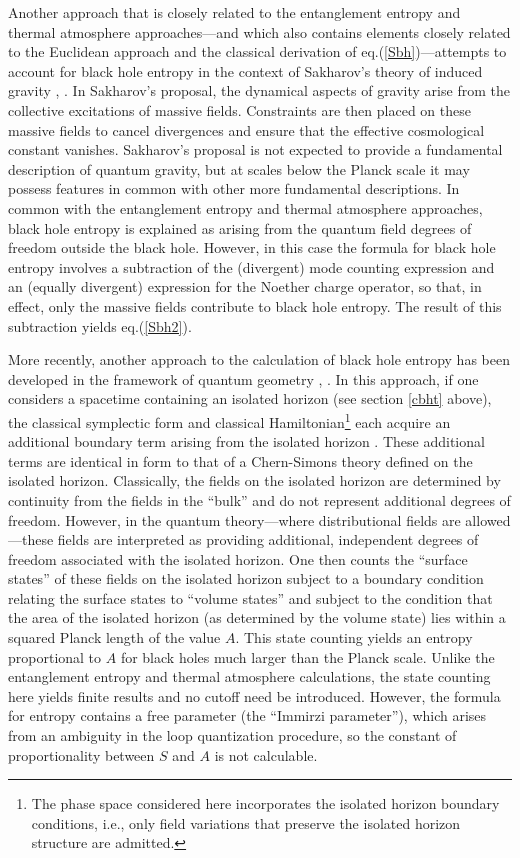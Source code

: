Another approach that is closely related to the entanglement entropy
and thermal atmosphere approaches---and which also contains elements
closely related to the Euclidean approach and the classical derivation
of eq.(\ref{Sbh})---attempts to account for black hole entropy in the
context of Sakharov's theory of induced gravity \cite{fro1},
\cite{fro2}. In Sakharov's proposal, the dynamical aspects of gravity
arise from the collective excitations of massive fields. Constraints
are then placed on these massive fields to cancel divergences and
ensure that the effective cosmological constant vanishes. Sakharov's
proposal is not expected to provide a fundamental description of
quantum gravity, but at scales below the Planck scale it may possess
features in common with other more fundamental descriptions. In common
with the entanglement entropy and thermal atmosphere approaches, black
hole entropy is explained as arising from the quantum field degrees of
freedom outside the black hole. However, in this case the formula for
black hole entropy involves a subtraction of the (divergent) mode
counting expression and an (equally divergent) expression for the
Noether charge operator, so that, in effect, only the massive fields
contribute to black hole entropy. The result of this subtraction
yields eq.(\ref{Sbh2}).

More recently, another approach to the calculation of black hole
entropy has been developed in the framework of quantum geometry
\cite{abck}, \cite{ak}. In this approach, if one considers a spacetime
containing an isolated horizon (see section \ref{cbht} above), the
classical symplectic form and classical Hamiltonian\footnote{The phase
space \cite{ack} considered here incorporates the isolated horizon
boundary conditions, i.e., only field variations that preserve the
isolated horizon structure are admitted.} each acquire an additional
boundary term arising from the isolated horizon \cite{afk}. These
additional terms are identical in form to that of a Chern-Simons
theory defined on the isolated horizon.  Classically, the fields on
the isolated horizon are determined by continuity from the fields in
the ``bulk'' and do not represent additional degrees of
freedom. However, in the quantum theory---where distributional fields
are allowed---these fields are interpreted as providing additional,
independent degrees of freedom associated with the isolated
horizon. One then counts the ``surface states'' of these fields on the
isolated horizon subject to a boundary condition relating the surface
states to ``volume states'' and subject to the condition that the area
of the isolated horizon (as determined by the volume state) lies
within a squared Planck length of the value $A$. This state counting
yields an entropy proportional to $A$ for black holes much larger than
the Planck scale. Unlike the entanglement entropy and thermal
atmosphere calculations, the state counting here yields finite results
and no cutoff need be introduced. However, the formula for entropy
contains a free parameter (the ``Immirzi parameter''), which arises
from an ambiguity in the loop quantization procedure, so the constant
of proportionality between $S$ and $A$ is not calculable.

